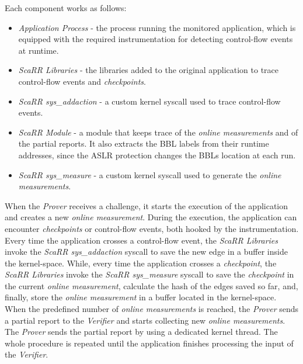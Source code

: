 Each component works as follows:  
\begin{itemize}
	\item \emph{Application Process} - the process running the monitored 
	application, which is equipped with the required instrumentation for 
	detecting control-flow events at runtime.
	\item \emph{ScaRR Libraries} - the libraries added to the original 
	application to trace control-flow events and \emph{checkpoints}.
	\item \emph{ScaRR sys\_addaction} - a custom kernel syscall used to trace 
	control-flow events.
	\item \emph{ScaRR Module} - a module that keeps trace of the \emph{online 
	measurements} and of the partial reports. It also extracts the BBL labels 
	from their runtime addresses, since the ASLR protection changes the BBLs 
	location at each run.
	\item \emph{ScaRR sys\_measure} - a custom kernel syscall used to generate 
	the \emph{online measurements}. 
\end{itemize}
When the \emph{Prover} receives a challenge, it starts the execution of the 
application and creates a new \emph{online measurement}.
During the execution, the application can encounter \emph{checkpoints} or 
control-flow events, both hooked by the instrumentation.
Every time the application crosses a control-flow event, the \emph{ScaRR 
Libraries}
invoke the \emph{ScaRR sys\_addaction} syscall to save the new edge in a buffer 
inside the kernel-space.
While, every time the application crosses a \emph{checkpoint}, the \emph{ScaRR 
Libraries}
invoke the \emph{ScaRR sys\_measure} syscall to save the \emph{checkpoint}
in the current \emph{online measurement}, calculate the hash of the edges saved 
so far, and,
finally, store the \emph{online measurement} in a buffer located in the 
kernel-space.
When the predefined number of \emph{online measurements} is reached, 
the \emph{Prover} sends a partial report to the \emph{Verifier} and starts 
collecting new \emph{online measurements}.
The \emph{Prover} sends the partial report by using a dedicated kernel thread.
The whole procedure is repeated until the application finishes processing the 
input of the \emph{Verifier}. 

